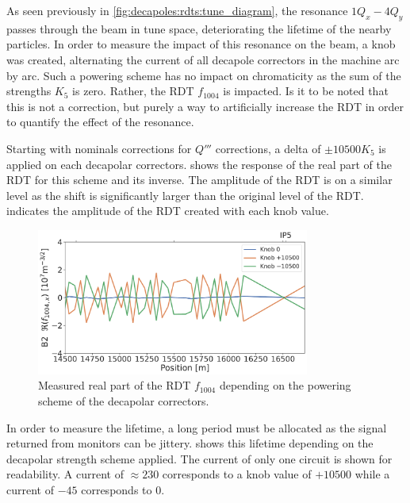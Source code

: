 As seen previously in \cref{fig:decapoles:rdts:tune_diagram}, the resonance $1Q_x - 4Q_y$ passes
through the beam in tune space, deteriorating the lifetime of the nearby particles.
In order to measure the impact of this resonance on the beam, a knob was created, alternating the 
current of all decapole correctors in the machine arc by arc. Such a powering scheme has no impact
on chromaticity as the sum of the strengths $K_5$ is zero. Rather, the RDT $f_{1004}$ is impacted.
Is it to be noted that this is not a correction, but purely a way to artificially increase the RDT
in order to quantify the effect of the resonance.

Starting with nominals corrections for $Q'''$ corrections, a delta of $\pm 10500 K_5$ is applied on
each decapolar correctors.  shows the response of the
real part of the RDT for this scheme and its inverse. The amplitude of the RDT is on a similar level
as the shift is significantly larger than the original level of the RDT.
 indicates the amplitude of the RDT created with each
knob value.

\begin{figure}[!htb]
    \centering
    \includegraphics[width=0.8\textwidth]{./images/f1004/f1004x_knob_alt_lifetime_real.pdf}
    \caption{Measured real part of the RDT $f_{1004}$ depending on the powering scheme of the decapolar
    correctors.}
    \label{fig:decapoles:impact:alternating_knob}
\end{figure}

In order to measure the lifetime, a long period must be allocated as the signal returned from
monitors can be jittery.  shows this lifetime depending on
the decapolar strength scheme applied. The current of only one circuit is shown for readability.
A current of $\approx 230$ corresponds to a knob value of $+10500$ while a current of $-45$
corresponds to $0$.

